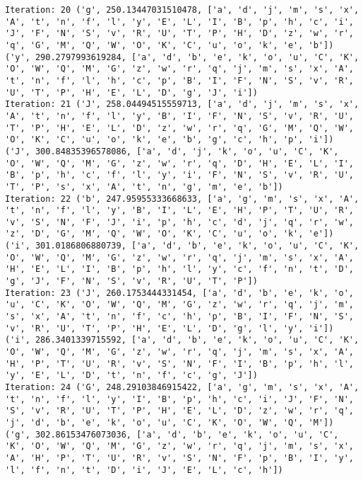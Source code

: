 \documentclass[english,man]{apa6}
\begin{document}
\begin{verbatim}
Iteration: 20 ('g', 250.13447031510478, ['a', 'd', 'j', 'm', 's', 'x', 'A', 't', 'n', 'f', 'l', 'y', 'E', 'L', 'I', 'B', 'p', 'h', 'c', 'i', 'J', 'F', 'N', 'S', 'v', 'R', 'U', 'T', 'P', 'H', 'D', 'z', 'w', 'r', 'q', 'G', 'M', 'Q', 'W', 'O', 'K', 'C', 'u', 'o', 'k', 'e', 'b']) ('y', 290.2797993619284, ['a', 'd', 'b', 'e', 'k', 'o', 'u', 'C', 'K', 'O', 'W', 'Q', 'M', 'G', 'z', 'w', 'r', 'q', 'j', 'm', 's', 'x', 'A', 't', 'n', 'f', 'l', 'h', 'c', 'p', 'B', 'I', 'F', 'N', 'S', 'v', 'R', 'U', 'T', 'P', 'H', 'E', 'L', 'D', 'g', 'J', 'i'])
Iteration: 21 ('J', 258.04494515559713, ['a', 'd', 'j', 'm', 's', 'x', 'A', 't', 'n', 'f', 'l', 'y', 'B', 'I', 'F', 'N', 'S', 'v', 'R', 'U', 'T', 'P', 'H', 'E', 'L', 'D', 'z', 'w', 'r', 'q', 'G', 'M', 'Q', 'W', 'O', 'K', 'C', 'u', 'o', 'k', 'e', 'b', 'g', 'c', 'h', 'p', 'i']) ('J', 300.84835396578086, ['a', 'd', 'j', 'k', 'o', 'u', 'C', 'K', 'O', 'W', 'Q', 'M', 'G', 'z', 'w', 'r', 'q', 'D', 'H', 'E', 'L', 'I', 'B', 'p', 'h', 'c', 'f', 'l', 'y', 'i', 'F', 'N', 'S', 'v', 'R', 'U', 'T', 'P', 's', 'x', 'A', 't', 'n', 'g', 'm', 'e', 'b'])
Iteration: 22 ('b', 247.95955333668633, ['a', 'g', 'm', 's', 'x', 'A', 't', 'n', 'f', 'l', 'y', 'B', 'I', 'L', 'E', 'H', 'P', 'T', 'U', 'R', 'v', 'S', 'N', 'F', 'J', 'i', 'p', 'h', 'c', 'd', 'j', 'q', 'r', 'w', 'z', 'D', 'G', 'M', 'Q', 'W', 'O', 'K', 'C', 'u', 'o', 'k', 'e']) ('i', 301.0186806880739, ['a', 'd', 'b', 'e', 'k', 'o', 'u', 'C', 'K', 'O', 'W', 'Q', 'M', 'G', 'z', 'w', 'r', 'q', 'j', 'm', 's', 'x', 'A', 'H', 'E', 'L', 'I', 'B', 'p', 'h', 'l', 'y', 'c', 'f', 'n', 't', 'D', 'g', 'J', 'F', 'N', 'S', 'v', 'R', 'U', 'T', 'P'])
Iteration: 23 ('J', 260.1753444331454, ['a', 'd', 'b', 'e', 'k', 'o', 'u', 'C', 'K', 'O', 'W', 'Q', 'M', 'G', 'z', 'w', 'r', 'q', 'j', 'm', 's', 'x', 'A', 't', 'n', 'f', 'c', 'h', 'p', 'B', 'I', 'F', 'N', 'S', 'v', 'R', 'U', 'T', 'P', 'H', 'E', 'L', 'D', 'g', 'l', 'y', 'i']) ('i', 286.3401339715592, ['a', 'd', 'b', 'e', 'k', 'o', 'u', 'C', 'K', 'O', 'W', 'Q', 'M', 'G', 'z', 'w', 'r', 'q', 'j', 'm', 's', 'x', 'A', 'H', 'P', 'T', 'U', 'R', 'v', 'S', 'N', 'F', 'I', 'B', 'p', 'h', 'l', 'y', 'E', 'L', 'D', 't', 'n', 'f', 'c', 'g', 'J'])
Iteration: 24 ('G', 248.29103846915422, ['a', 'g', 'm', 's', 'x', 'A', 't', 'n', 'f', 'l', 'y', 'I', 'B', 'p', 'h', 'c', 'i', 'J', 'F', 'N', 'S', 'v', 'R', 'U', 'T', 'P', 'H', 'E', 'L', 'D', 'z', 'w', 'r', 'q', 'j', 'd', 'b', 'e', 'k', 'o', 'u', 'C', 'K', 'O', 'W', 'Q', 'M']) ('g', 302.86153476073036, ['a', 'd', 'b', 'e', 'k', 'o', 'u', 'C', 'K', 'O', 'W', 'Q', 'M', 'G', 'z', 'w', 'r', 'q', 'j', 'm', 's', 'x', 'A', 'H', 'P', 'T', 'U', 'R', 'v', 'S', 'N', 'F', 'p', 'B', 'I', 'y', 'l', 'f', 'n', 't', 'D', 'i', 'J', 'E', 'L', 'c', 'h'])

\end{verbatim}
\end{document}

